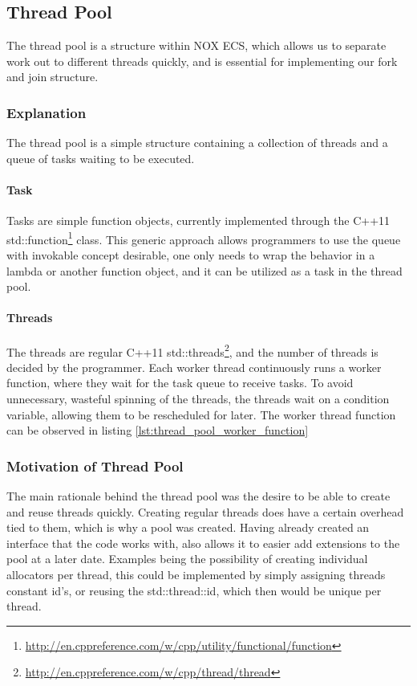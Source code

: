 \subsection{Thread Pool}
The thread pool is a structure within NOX ECS, which allows us to separate work out to different threads quickly, and is essential for implementing our fork and join structure.

\subsubsection{Explanation}
The thread pool is a simple structure containing a collection of threads and a queue of tasks waiting to be executed.

\paragraph{Task}
Tasks are simple function objects, currently implemented through the C++11 std::function\footnote{\url{http://en.cppreference.com/w/cpp/utility/functional/function}} class.
This generic approach allows programmers to use the queue with invokable concept desirable, one only needs to wrap the behavior in a lambda or another function object, and it can be utilized as a task in the thread pool.

\paragraph{Threads}
The threads are regular C++11 std::threads\footnote{\url{http://en.cppreference.com/w/cpp/thread/thread}}, and the number of threads is decided by the programmer.
Each worker thread continuously runs a worker function, where they wait for the task queue to receive tasks.
To avoid unnecessary, wasteful spinning of the threads, the threads wait on a condition variable,
allowing them to be rescheduled for later.
The worker thread function can be observed in listing \ref{lst:thread_pool_worker_function}


\subsubsection{Motivation of Thread Pool}
The main rationale behind the thread pool was the desire to be able to create and reuse threads quickly.
Creating regular threads does have a certain overhead tied to them, which is why a pool was created.
Having already created an interface that the code works with, also allows it to easier add extensions to the pool
at a later date. Examples being the possibility of creating individual allocators per thread,
this could be implemented by simply assigning threads constant id's, or reusing the std::thread::id, which then would be unique per thread.

